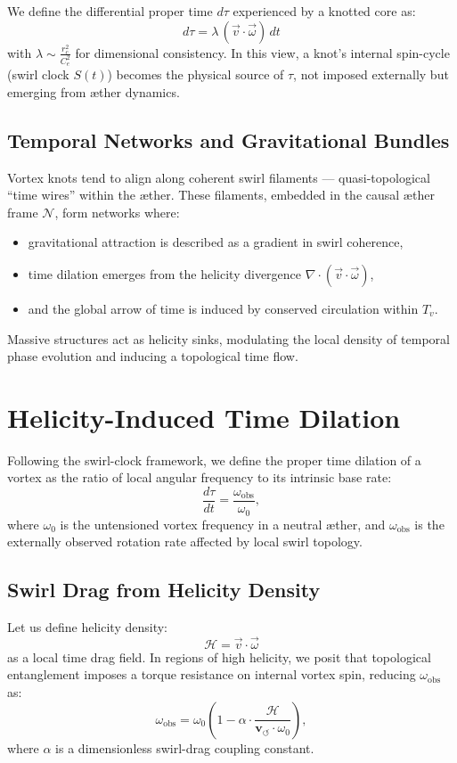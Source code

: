 We define the differential proper time \( d\tau \) experienced by a knotted core as:
\[
    \boxed{
    d\tau = \lambda \, (\vec{v} \cdot \vec{\omega}) \, dt
    }
\]
with \( \lambda \sim \frac{r_c^2}{C_e^2} \) for dimensional consistency. In this view, a knot's internal spin-cycle (swirl clock \( S(t) \)) becomes the physical source of \( \tau \), not imposed externally but emerging from æther dynamics.

\subsection*{Temporal Networks and Gravitational Bundles}

Vortex knots tend to align along coherent swirl filaments — quasi-topological “time wires” within the æther. These filaments, embedded in the causal æther frame \( \mathcal{N} \), form networks where:
\begin{itemize}
  \item gravitational attraction is described as a gradient in swirl coherence,
  \item time dilation emerges from the helicity divergence \( \nabla \cdot (\vec{v} \cdot \vec{\omega}) \),
  \item and the global arrow of time is induced by conserved circulation within \( T_v \).
\end{itemize}

Massive structures act as helicity sinks, modulating the local density of temporal phase evolution and inducing a topological time flow.

\section{Helicity-Induced Time Dilation}

Following the swirl-clock framework, we define the proper time dilation of a vortex as the ratio of local angular frequency to its intrinsic base rate:
\[
    \frac{d\tau}{dt} = \frac{\omega_{\text{obs}}}{\omega_0},
\]
where \( \omega_0 \) is the untensioned vortex frequency in a neutral æther, and \( \omega_{\text{obs}} \) is the externally observed rotation rate affected by local swirl topology.

\subsection*{Swirl Drag from Helicity Density}

Let us define helicity density:
\[
    \mathcal{H} = \vec{v} \cdot \vec{\omega}
\]
as a local time drag field. In regions of high helicity, we posit that topological entanglement imposes a torque resistance on internal vortex spin, reducing \( \omega_{\text{obs}} \) as:
\[
    \omega_{\text{obs}} = \omega_0 \left( 1 - \alpha \cdot \frac{\mathcal{H}}{\mathbf{v}_{\scriptscriptstyle\boldsymbol{\circlearrowleft}} \cdot \omega_0} \right),
\]
where \( \alpha \) is a dimensionless swirl-drag coupling constant.


